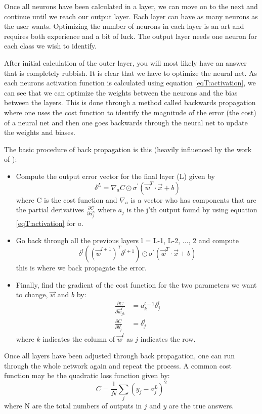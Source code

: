 Once all neurons have been calculated in a layer, we can move on to the next and continue until we reach our output layer. Each layer can have as many neurons as the user wants. Optimizing the number of neurons in each layer is an art and requires both experience and a bit of luck. The output layer needs one neuron for each class we wish to identify.

After initial calculation of the outer layer, you will most likely have an answer that is completely rubbish. It is clear that we have to optimize the neural net. As each neurons activation function is calculated using equation \eqref{eqT:activation}, we can see that we can optimize the weights between the neurons and the bias between the layers. This is done through a method called backwards propagation where one uses the cost function to identify the magnitude of the error (the cost) of a neural net and then one goes backwards through the neural net to update the weights and biases.

The basic procedure of back propagation is this (heavily influenced by the work of \citet{Nielsen}):
\begin{itemize}
\item Compute the output error vector for the final layer (L) given by
\begin{equation*}
\delta^L = \nabla_a C \odot \sigma^{'}(\vec{w}^T \cdot \vec{x} + b)
\end{equation*}
where C is the cost function and $\nabla_a$ is a vector who has components that are the partial derivatives $\frac{\partial C}{\partial a_j^L}$ where $a_j$ is the j'th output found by using equation \eqref{eqT:activation} for $a$.
\item Go back through all the previous layers l = L-1, L-2, ..., 2 and compute
\begin{equation*}
\delta^l ((\vec{w}^{l + 1})^T \delta^{l + 1}) \odot \sigma^{'}(\vec{w}^T \cdot \vec{x} + b)
\end{equation*}
this is where we back propagate the error.
\item Finally, find the gradient of the cost function for the two parameters we want to change, $\vec{w}$ and $b$ by:
\begin{align*}
\frac{\partial C}{\partial \vec{w}_{jk}^l} &= a_k^{l-1}\delta_{j}^{l} \\
\frac{\partial C}{\partial b_{j}^l} &= \delta_{j}^{l}
\end{align*}
where $k$ indicates the column of $\vec{w}^l$ as $j$ indicates the row.
\end{itemize}
Once all layers have been adjusted through back propagation, one can run through the whole network again and repeat the process. A common cost function may be the quadratic loss function given by:
\begin{equation}
C = \frac{1}{N} \sum\limits_{j} (y_j - a_j^L)^2
\end{equation}
where N are the total numbers of outputs in $j$ and $y$ are the true answers.
